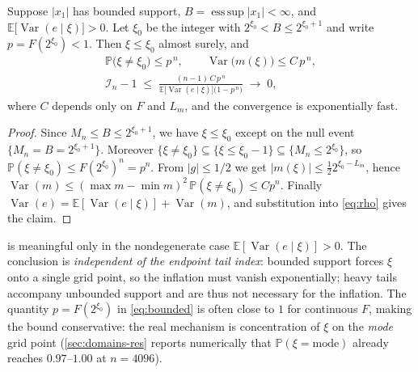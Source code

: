 \documentclass[twocolumn,review,hidelinks,oneeqnum,onetabnum,onefignum,onethmnum]{siamart251216}
\begin{document}
\begin{proposition}
\label{prop:bound}
Suppose $|x_1|$ has bounded support, $B=\operatorname{ess\,sup}|x_1|<\infty$,
and $\mathbb{E}\bigl[\operatorname{Var}(e\mid\xi)\bigr]>0$. Let $\xi_0$ be the
integer with $2^{\xi_0}<B\le2^{\xi_0+1}$ and write $p=F(2^{\xi_0})<1$. Then
$\xi\le\xi_0$ almost surely, and
\begin{equation}
\begin{gathered}
\mathbb{P}\bigl(\xi\ne\xi_0\bigr)\le p^{\,n},
\qquad
\operatorname{Var}\bigl(m(\xi)\bigr)\le C\,p^{\,n},\\
\mathcal I_n-1\;\le\;\frac{(n-1)\,C\,p^{\,n}}{\mathbb{E}\bigl[\operatorname{Var}(e\mid\xi)\bigr]\bigl(1-p^{\,n}\bigr)}\;\longrightarrow\;0 ,
\end{gathered}
\label{eq:bounded}
\end{equation}
where $C$ depends only on $F$ and $L_m$, and the convergence is exponentially
fast.
\end{proposition}

\begin{proof}
Since $M_n\le B\le2^{\xi_0+1}$, we have $\xi\le\xi_0$ except on the
null event $\{M_n=B=2^{\xi_0+1}\}$. Moreover
$\{\xi\ne\xi_0\}\subseteq\{\xi\le\xi_0-1\}\subseteq\{M_n\le2^{\xi_0}\}$, so
$\mathbb{P}(\xi\ne\xi_0)\le F(2^{\xi_0})^n=p^n$. From $|g|\le1/2$ we get
$|m(\xi)|\le\tfrac122^{\xi_0-L_m}$, hence
$\operatorname{Var}(m)\le(\max m-\min m)^2\,\mathbb{P}(\xi\ne\xi_0)\le Cp^n$.
Finally $\operatorname{Var}(e)=\mathbb{E}[\operatorname{Var}(e\mid\xi)]+\operatorname{Var}(m)$,
and substitution into \cref{eq:rho} gives the claim.
\end{proof}

\begin{remark}
 is meaningful only in the nondegenerate case
$\mathbb{E}[\operatorname{Var}(e\mid\xi)]>0$. The conclusion is \emph{independent
of the endpoint tail index}: bounded support forces $\xi$ onto a single grid
point, so the inflation must vanish exponentially; heavy tails accompany
unbounded support and are thus not necessary for the inflation. The quantity
$p=F(2^{\xi_0})$ in \cref{eq:bounded} is often close to $1$ for continuous $F$,
making the bound conservative: the real mechanism is concentration of $\xi$ on
the \emph{mode} grid point (\cref{sec:domains-res} reports numerically that
$\mathbb{P}(\xi=\text{mode})$ already reaches $0.97$--$1.00$ at $n=4096$).
\end{remark}
\end{document}
